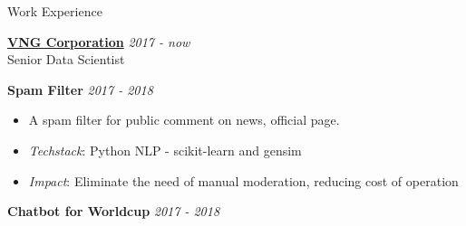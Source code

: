\documentclass{resume} %
\begin{document}
\begin{rSection}{Work Experience}

{\bf \underline{VNG Corporation}} \hfill {\em 2017 - now}
\\Senior Data Scientist

\textbf{Spam Filter} \hfill {\em \textit{2017 - 2018}}

\begin{itemize}
    \item A spam filter for public comment on news, official page.
    \item \textit{Techstack}: Python NLP - scikit-learn and gensim
    \item \textit{Impact}: Eliminate the need of manual moderation, reducing cost of operation
\end{itemize}




\textbf{Chatbot for Worldcup} \hfill {\em \textit{2017 - 2018}}


\end{rSection}
\end{document}
